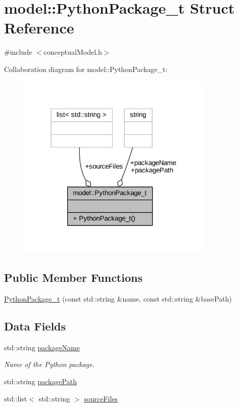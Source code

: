 \hypertarget{structmodel_1_1_python_package__t}{}\section{model\+:\+:Python\+Package\+\_\+t Struct Reference}
\label{structmodel_1_1_python_package__t}


{\ttfamily \#include $<$conceptual\+Model.\+h$>$}



Collaboration diagram for model\+:\+:Python\+Package\+\_\+t\+:
\nopagebreak
\begin{figure}[H]
\begin{center}
\leavevmode
\includegraphics[width=267pt]{structmodel_1_1_python_package__t__coll__graph}
\end{center}
\end{figure}
\subsection*{Public Member Functions}
\begin{DoxyCompactItemize}
\item 
\hyperlink{structmodel_1_1_python_package__t_aca2f23febf3ce94b0b1e2b86b2d56fc0}{Python\+Package\+\_\+t} (const std\+::string \&name, const std\+::string \&base\+Path)
\end{DoxyCompactItemize}
\subsection*{Data Fields}
\begin{DoxyCompactItemize}
\item 
std\+::string \hyperlink{structmodel_1_1_python_package__t_ac246e460adb579acd173c88e3527836a}{package\+Name}
\begin{DoxyCompactList}\small\item\em Name of the Python package. \end{DoxyCompactList}\item 
std\+::string \hyperlink{structmodel_1_1_python_package__t_a5e45a39bcd939f591d8fb71086c36d0b}{package\+Path}
\item 
std\+::list$<$ std\+::string $>$ \hyperlink{structmodel_1_1_python_package__t_a1a87a73fa3269cdd454654f1d3a07cd0}{source\+Files}
\end{DoxyCompactItemize}


